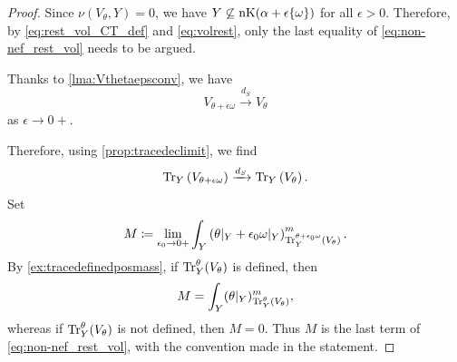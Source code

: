 \begin{proof} Since $\nu(V_\theta, Y)=0$, we have $Y\not\subseteq \operatorname{nK}(\alpha+\epsilon\{\omega\})$ for all $\epsilon>0$. Therefore, by \eqref{eq:rest_vol_CT_def} and \eqref{eq:volrest}, only the last equality of \eqref{eq:non-nef_rest_vol} needs to be argued.

Thanks to \cref{lma:Vthetaepsconv}, we have
\[
    V_{\theta+\epsilon\omega}\xrightarrow{d_S}V_{\theta}
\]
as $\epsilon\to 0+$.

Therefore, using \cref{prop:tracedeclimit}, we find
\[
\operatorname{Tr}_Y\left( V_{\theta+\epsilon\omega} \right) \xrightarrow{d_S} \operatorname{Tr}_Y\left(V_{\theta}\right).
\]
Set
\[
M\coloneqq \lim_{\epsilon_0\to 0+}\int_Y \left(\theta|_Y+\epsilon_0\omega|_Y\right)^m_{\operatorname{Tr}_Y^{\theta+\epsilon_0\omega}(V_{\theta})}.
\]
By \cref{ex:tracedefinedposmass}, if $\operatorname{Tr}_Y^{\theta}(V_{\theta})$ is defined, then
\[
    M=\int_Y (\theta|_Y)^m_{\operatorname{Tr}_Y^{\theta}(V_{\theta})},
\]
whereas if $\operatorname{Tr}_Y^{\theta}(V_{\theta})$ is not defined, then $M=0$. Thus $M$ is the last term of \eqref{eq:non-nef_rest_vol}, with the convention made in the statement.


\end{proof}

